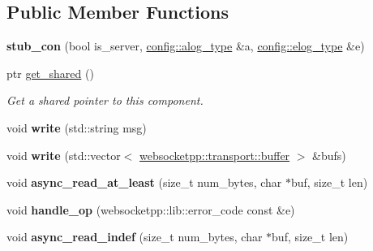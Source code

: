 \subsection*{Public Member Functions}
\begin{DoxyCompactItemize}
\item 
{\bfseries stub\+\_\+con} (bool is\+\_\+server, \hyperlink{classwebsocketpp_1_1log_1_1stub}{config\+::alog\+\_\+type} \&a, \hyperlink{classwebsocketpp_1_1log_1_1stub}{config\+::elog\+\_\+type} \&e)\hypertarget{structstub__con_a7ad39065d251d72c86178e4a1bf4f9f1}{}\label{structstub__con_a7ad39065d251d72c86178e4a1bf4f9f1}

\item 
ptr \hyperlink{structstub__con_adc3b613da536874da64369433eceaf19}{get\+\_\+shared} ()\hypertarget{structstub__con_adc3b613da536874da64369433eceaf19}{}\label{structstub__con_adc3b613da536874da64369433eceaf19}

\begin{DoxyCompactList}\small\item\em Get a shared pointer to this component. \end{DoxyCompactList}\item 
void {\bfseries write} (std\+::string msg)\hypertarget{structstub__con_a66c12a3d422977b7a278020b94d7611b}{}\label{structstub__con_a66c12a3d422977b7a278020b94d7611b}

\item 
void {\bfseries write} (std\+::vector$<$ \hyperlink{structwebsocketpp_1_1transport_1_1buffer}{websocketpp\+::transport\+::buffer} $>$ \&bufs)\hypertarget{structstub__con_a14e97604627969cec94295201745f893}{}\label{structstub__con_a14e97604627969cec94295201745f893}

\item 
void {\bfseries async\+\_\+read\+\_\+at\+\_\+least} (size\+\_\+t num\+\_\+bytes, char $\ast$buf, size\+\_\+t len)\hypertarget{structstub__con_a3ada58523e3f8e28cf501dc97c16444f}{}\label{structstub__con_a3ada58523e3f8e28cf501dc97c16444f}

\item 
void {\bfseries handle\+\_\+op} (websocketpp\+::lib\+::error\+\_\+code const \&e)\hypertarget{structstub__con_a95bfb56bec27e86ba2e30af2bca1c213}{}\label{structstub__con_a95bfb56bec27e86ba2e30af2bca1c213}

\item 
void {\bfseries async\+\_\+read\+\_\+indef} (size\+\_\+t num\+\_\+bytes, char $\ast$buf, size\+\_\+t len)\hypertarget{structstub__con_adce6bc3610b7465c5a3fca87ae02cda1}{}\label{structstub__con_adce6bc3610b7465c5a3fca87ae02cda1}


\end{DoxyCompactItemize}
